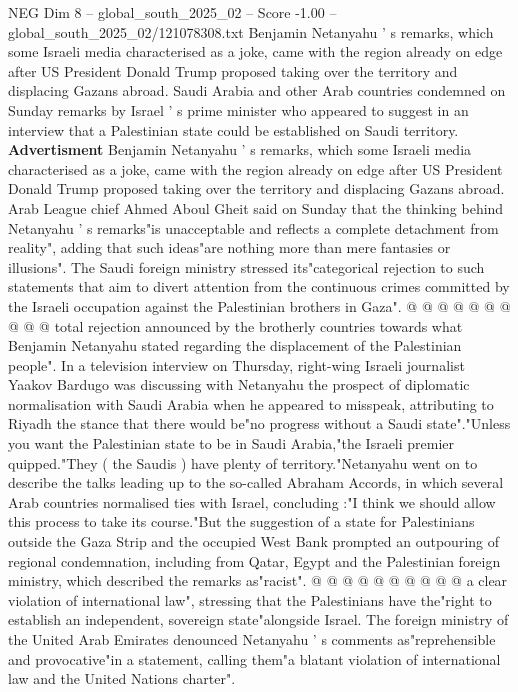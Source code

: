 \begin{textsample}{NEG Dim 8 – global\_south\_2025\_02 – Score -1.00 – global\_south\_2025\_02/121078308.txt}  \label{ex:f8_neg_069}
Benjamin Netanyahu ' s remarks, which some Israeli media characterised as a joke, came with the region already on edge after US President Donald Trump proposed taking over the territory and displacing Gazans abroad.
Saudi Arabia and other Arab countries condemned on Sunday remarks by Israel ' s prime minister who appeared to suggest in an interview that a Palestinian state could be established on Saudi territory. \textbf{Advertisment} Benjamin Netanyahu ' s remarks, which some Israeli media characterised as a joke, came with the region already on edge after US President Donald Trump proposed taking over the territory and displacing Gazans abroad.
Arab League chief Ahmed Aboul Gheit said on Sunday that the thinking behind Netanyahu ' s remarks"is unacceptable and reflects a complete detachment from reality", adding that such ideas"are nothing more than mere fantasies or illusions".
The Saudi foreign ministry stressed its"categorical rejection to such statements that aim to divert attention from the continuous crimes committed by the Israeli occupation against the Palestinian brothers in Gaza". @ @ @ @ @ @ @ @ @ @ total rejection announced by the brotherly countries towards what Benjamin Netanyahu stated regarding the displacement of the Palestinian people".
In a television interview on Thursday, right-wing Israeli journalist Yaakov Bardugo was discussing with Netanyahu the prospect of diplomatic normalisation with Saudi Arabia when he appeared to misspeak, attributing to Riyadh the stance that there would be"no progress without a Saudi state"."Unless you want the Palestinian state to be in Saudi Arabia,"the Israeli premier quipped."They ( the Saudis ) have plenty of territory."Netanyahu went on to describe the talks leading up to the so-called Abraham Accords, in which several Arab countries normalised ties with Israel, concluding :"I think we should allow this process to take its course."But the suggestion of a state for Palestinians outside the Gaza Strip and the occupied West Bank prompted an outpouring of regional condemnation, including from Qatar, Egypt and the Palestinian foreign ministry, which described the remarks as"racist". @ @ @ @ @ @ @ @ @ @ a clear violation of international law", stressing that the Palestinians have the"right to establish an independent, sovereign state"alongside Israel.
The foreign ministry of the United Arab Emirates denounced Netanyahu ' s comments as"reprehensible and provocative"in a statement, calling them"a blatant violation of international law and the United Nations charter".

\end{textsample}
